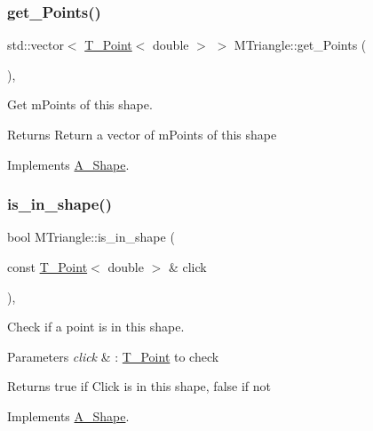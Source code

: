 \subsubsection{\texorpdfstring{get\+\_\+\+Points()}{get\_Points()}}
{\footnotesize\ttfamily std\+::vector$<$ \hyperlink{classPoint}{T_Point}$<$ double $>$ $>$ M\+Triangle\+::get\+\_\+\+Points (\begin{DoxyParamCaption}{ }\end{DoxyParamCaption})\hspace{0.3cm}{\ttfamily [override]}, {\ttfamily [virtual]}}



Get mPoints of this shape.

\begin{DoxyReturn}{Returns}
Return a vector of mPoints of this shape
\end{DoxyReturn}


Implements \hyperlink{classShape_add74a5c682840fa4a519242b1ddbd0b5}{A_Shape}.

\mbox{\label{classMTriangle_a4cc4cd63537ead67a0b68d1ab25111b4}} 
\subsubsection{\texorpdfstring{is\+\_\+in\+\_\+shape()}{is\_in\_shape()}}
{\footnotesize\ttfamily bool M\+Triangle\+::is\+\_\+in\+\_\+shape (\begin{DoxyParamCaption}\item[{const \hyperlink{classPoint}{T_Point}$<$ double $>$ \&}]{click }\end{DoxyParamCaption})\hspace{0.3cm}{\ttfamily [override]}, {\ttfamily [virtual]}}



Check if a point is in this shape. 


\begin{DoxyParams}{Parameters}
{\em click} & \+: \hyperlink{classPoint}{T_Point} to check \\
\hline
\end{DoxyParams}
\begin{DoxyReturn}{Returns}
true if Click is in this shape, false if not
\end{DoxyReturn}


Implements \hyperlink{classShape_aa09a621da090e42840b4bec7ffb27620}{A_Shape}.

